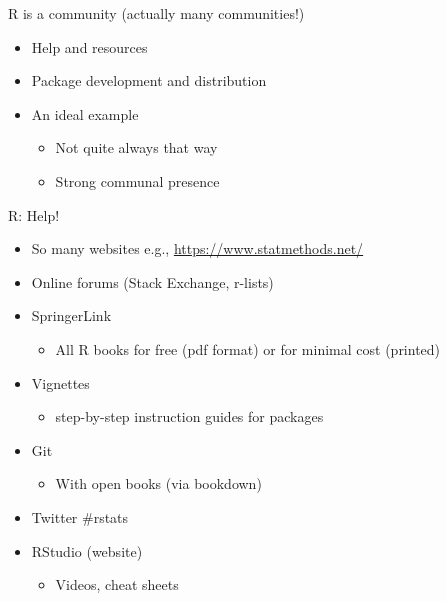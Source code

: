 \documentclass[ignorenonframetext,]{beamer}
\providecommand{\tightlist}{%
  \setlength{\itemsep}{0pt}\setlength{\parskip}{0pt}}
\begin{document}
\begin{frame}{R is a community (actually many communities!)}
\protect\hypertarget{r-is-a-community-actually-many-communities}{}

\begin{itemize}
\tightlist
\item
  Help and resources
\item
  Package development and distribution
\item
  An ideal example

  \begin{itemize}
  \tightlist
  \item
    Not quite always that way
  \item
    Strong communal presence
  \end{itemize}
\end{itemize}

\end{frame}

\begin{frame}{R: Help!}
\protect\hypertarget{r-help}{}

\begin{itemize}
\tightlist
\item
  So many websites e.g., \url{https://www.statmethods.net/}
\item
  Online forums (Stack Exchange, r-lists)
\item
  SpringerLink

  \begin{itemize}
  \tightlist
  \item
    All R books for free (pdf format) or for minimal cost (printed)
  \end{itemize}
\item
  Vignettes

  \begin{itemize}
  \tightlist
  \item
    step-by-step instruction guides for packages
  \end{itemize}
\item
  Git

  \begin{itemize}
  \tightlist
  \item
    With open books (via bookdown)
  \end{itemize}
\item
  Twitter \#rstats
\item
  RStudio (website)

  \begin{itemize}
  \tightlist
  \item
    Videos, cheat sheets
  \end{itemize}
\end{itemize}

\end{frame}
\end{document}
